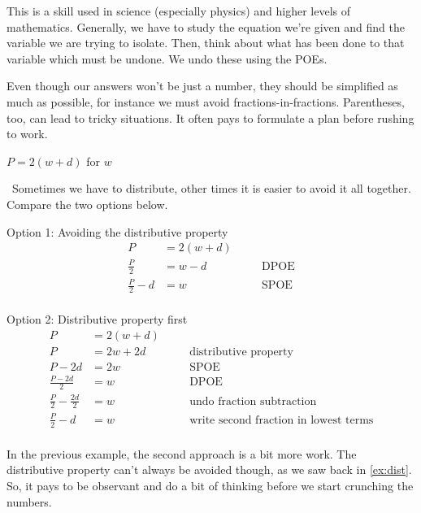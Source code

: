 This is a skill used in science (especially physics) and higher levels of mathematics. Generally, we have to study the equation we're given and find the variable we are trying to isolate. Then, think about what has been done to that variable which must be undone. We undo these using the POEs.


Even though our answers won't be just a number, they should be simplified as much as possible, for instance we must avoid fractions-in-fractions. Parentheses, too, can lead to tricky situations. It often pays to formulate a plan before rushing to work.

\begin{boxex}
$P = 2( w + d )$ for $w$

\exsoln\ Sometimes we have to distribute, other times it is easier to avoid it all together. Compare the two options below.

Option 1: Avoiding the distributive property
\[\begin{aligned}
P &= 2(w + d)\\
\tfrac{P}{2} &= w - d
&&\quad\text{DPOE}\\
\tfrac{P}{2} - d &= w
&&\quad\text{SPOE}\\
\end{aligned}\]

Option 2: Distributive property first
\[\begin{aligned}
P &= 2(w + d)\\
P &= 2w + 2d
&&\quad\text{distributive property}\\
P - 2d &= 2w
&&\quad\text{SPOE}\\
\tfrac{P - 2d}{2}&= w
&&\quad\text{DPOE}\\
\tfrac{P}{2} - \tfrac{2d}{2}&= w
&&\quad\text{undo fraction subtraction}\\
\tfrac{P}{2} - d&= w
&&\quad\text{write second fraction in lowest terms}\\
\end{aligned}\]
\end{boxex}

In the previous example, the second approach is a bit more work. The distributive property can't always be avoided though, as we saw back in \cref{ex:dist}. So, it pays to be observant and do a bit of thinking before we start crunching the numbers.

